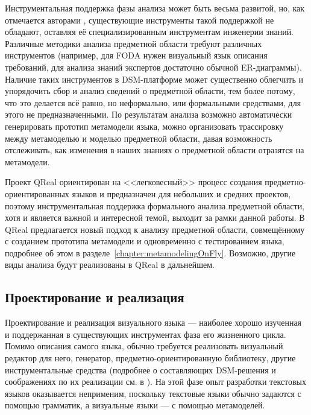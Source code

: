 Инструментальная поддержка фазы анализа может быть весьма развитой, но, как отмечается 
авторами \cite{mernik2005and}, существующие инструменты такой поддержкой не обладают, 
оставляя её специализированным инструментам инженерии знаний. Различные методики 
анализа предметной области требуют различных инструментов (например, для FODA нужен 
визуальный язык описания требований, для анализа знаний экспертов достаточно обычной 
ER-диаграммы). Наличие таких инструментов в \ac{DSM}-платформе может существенно облегчить 
и упорядочить сбор и анализ сведений о предметной области, тем более потому, что это 
делается всё равно, но неформально, или формальными средствами, для этого не предназначенными. 
По результатам анализа возможно автоматически генерировать прототип метамодели языка, 
можно организовать трассировку между метамоделью и моделью предметной области, давая 
возможность отслеживать, как изменения в наших знаниях о предметной области отразятся на метамодели.

Проект QReal ориентирован на <<легковесный>> процесс создания предметно-ориентированных 
языков и предназначен для небольших и средних проектов, поэтому инструментальная поддержка 
формального анализа предметной области, хотя и является важной и интересной темой, 
выходит за рамки данной работы. В QReal предлагается новый подход к анализу предметной 
области, совмещённому с созданием прототипа метамодели и одновременно с тестированием языка, 
подробнее об этом в разделе~\ref{chapter:metamodelingOnFly}. Возможно, другие виды анализа будут реализованы 
в QReal в дальнейшем.

\subsection{Проектирование и реализация}
Проектирование и реализация визуального языка --- наиболее хорошо изученная и поддержанная 
в существующих инструментах фаза его жизненного цикла. Помимо описания самого языка, 
обычно требуется реализовать визуальный редактор для него, генератор, предметно-ориентированную 
библиотеку, другие инструментальные средства (подробнее о составляющих \ac{DSM}-решения и 
соображениях по их реализации см. в \cite{kelly2008domain}). На этой фазе опыт разработки 
текстовых языков оказывается неприменим, поскольку текстовые языки обычно задаются с 
помощью грамматик, а визуальные языки --- с помощью метамоделей.

